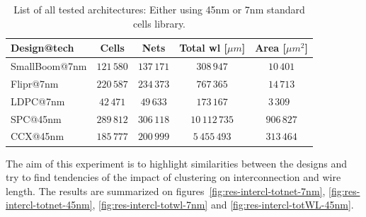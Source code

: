 \documentclass[11pt,a4paper]{report} %
\theoremstyle{customdef}
\begin{document}
\begin{table}[!h]
\centering
	\begin{tabular}{l|c|c|c|c}
	Design@tech & Cells & Nets & Total \gls{wl} [$\mu m$] & Area [$\mu m^2$] \\ \hline
	SmallBoom@7nm & $121\,580$ & $137\,171$ & $308\,947$ & $10\,401$ \\
	Flipr@7nm & $220\,587$ & $234\,373$ & $767\,365$ & $14\,713$ \\
	LDPC@7nm & $42\,471$ & $49\,633$ & $173\,167$ & $3\,309$ \\
	SPC@45nm & $289\,812$ & $306\,118$ & $10\,112\,735$ & $906\,827$ \\
	CCX@45nm & $185\,777$ & $200\,999$ & $5\,455\,493$ & $313\,464$ \\
	\end{tabular}
\caption{List of all tested architectures: Either using 45nm or 7nm standard cells library.}
\label{tab:arch-clust}
\end{table}

The aim of this experiment is to highlight similarities between the designs and try to find tendencies of the impact of clustering on interconnection and wire length.
The results are summarized on figures~\ref{fig:res-intercl-totnet-7nm}, \ref{fig:res-intercl-totnet-45nm}, \ref{fig:res-intercl-totwl-7nm} and \ref{fig:res-intercl-totWL-45nm}.
\end{document}

